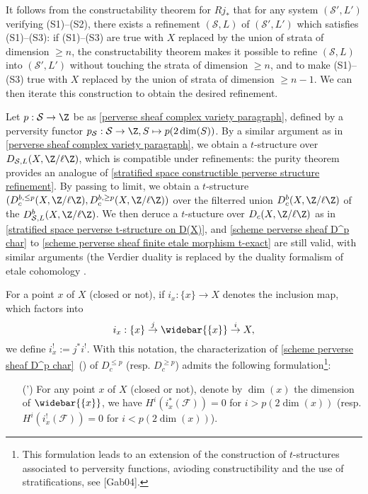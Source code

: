 It follows from the constructability theorem for $Rj_*$ \cite[VII]{SGA4.5} that for any system $(\mathcal{S}',L')$ verifying (S1)--(S2), there exists a refinement $(\mathcal{S},L)$ of $(\mathcal{S}',L')$ which satisfies (S1)--(S3): if (S1)--(S3) are true with $X$ replaced by the union of strata of dimension $\geq n$, the constructability theorem makes it possible to refine $(\mathcal{S},L)$ into $(\mathcal{S}',L')$ without touching the strata of dimension $\geq n$, and to make (S1)--(S3) true with $X$ replaced by the union of strata of dimension $\geq n-1$. We can then iterate this construction to obtain the desired refinement.\par

Let $p:\mathcal{S}\to\Z$ be as \ref{perverse sheaf complex variety paragraph}, defined by a perversity functor $p_\mathcal{S}:\mathcal{S}\to\Z, S\mapsto p(2\dim(S))$. By a similar argument as in \ref{perverse sheaf complex variety paragraph}, we obtain a $t$-structure over $D_{\mathcal{S},L}(X,\Z/\ell\Z)$, which is compatible under refinements: the purity theorem \cite[XVI 3.7]{SGA4-3} provides an analogue of \cref{stratified space constructible perverse structure refinement}. By passing to limit, we obtain a $t$-structure $(D_c^{b,\leq p}(X,\Z/\ell\Z),D_c^{b,\geq p}(X,\Z/\ell\Z))$ over the filterred union $D_c^b(X,\Z/\ell\Z)$ of the $D_{\mathcal{S},L}^b(X,\Z/\ell\Z)$. We then deruce a $t$-stucture over $D_c(X,\Z/\ell\Z)$ as in \cref{stratified space perverse t-structure on D(X)}, and \cref{scheme perverse sheaf D^p char} to \cref{scheme perverse sheaf finite etale morphism t-exact} are still valid, with similar arguments (the Verdier duality is replaced by the duality formalism of etale cohomology \cite[XVIII]{SGA4-3}.\par

For a point $x$ of $X$ (closed or not), if $i_x:\{x\}\to X$ denotes the inclusion map, which factors into
\[i_x:\{x\}\stackrel{j}{\to}\widebar{\{x\}}\stackrel{i}{\to}X,\]
we define $i_x^!:=j^*i^!$. With this notation, the characterization of \cref{scheme perverse sheaf D^p char}~() of $D_c^{\leq p}$ (resp. $D_c^{\geq p}$) admits the following formulation\footnote{This formulation leads to an extension of the construction of $t$-structures associated to perversity functions, avioding constructibility and the use of stratifications, see [Gab04].}:
\begin{enumerate}
    \item[(\rmnum{2}')] For any point $x$ of $X$ (closed or not), denote by $\dim(x)$ the dimension of $\widebar{\{x\}}$, we have $H^i(i_x^*(\mathscr{F}))=0$ for $i>p(2\dim(x))$ (resp. $H^i(i_x^!(\mathscr{F}))=0$ for $i<p(2\dim(x))$). 
\end{enumerate}

